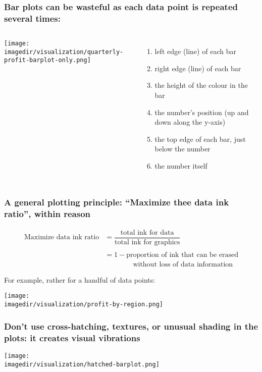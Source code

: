 \begin{frame}\frametitle{Bar plots can be wasteful as each data point is repeated several times:}
	
	\begin{columns}[c]
		\column{6cm} 
			\begin{center}
				\texttt{[image: \\imagedir/visualization/quarterly-profit-barplot-only.png]} 
			\end{center}
		\column{4cm} 
			\begin{enumerate}
				\item	left edge (line) of each bar 
				\item	right edge (line) of each bar 
				\item	the height of the colour in the bar 
				\item	the number's position (up and down along the y-axis) 
				\item	the top edge of each bar, just below the number 
				\item	the number itself 
			\end{enumerate}
	\end{columns}
\end{frame}

\begin{frame}\frametitle{A general plotting principle: ``Maximize thee data ink ratio'', within reason}
	\begin{exampleblock}{}
		\begin{center}
			\[
				\begin{array}{rl}
					\text{Maximize data ink ratio} 	&= \dfrac{\text{total ink for data}}{{\text{total ink for graphics}}} \\ \\
													&= 1 - \text{proportion of ink that can be erased} \\
													&\qquad\qquad \text{without loss of data information} 
			\end{array}
			\]
		\end{center}
	\end{exampleblock}
	For example, rather {\color{myOrange}{use a table}} for a handful of data points: 
	\begin{center}
		\texttt{[image: \\imagedir/visualization/profit-by-region.png]}
	\end{center}
\end{frame}

\begin{frame}\frametitle{Don't use cross-hatching, textures, or unusual shading in the plots: it creates visual vibrations }

	\begin{center}
		\texttt{[image: \\imagedir/visualization/hatched-barplot.png]}
	\end{center}
\end{frame}


